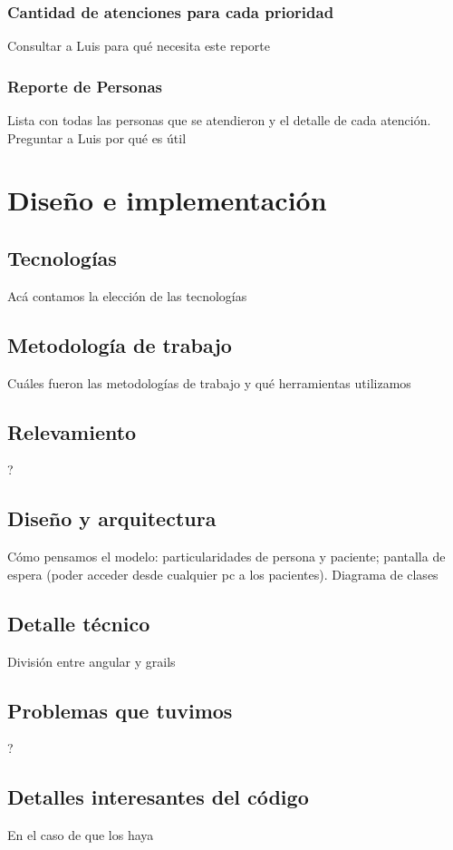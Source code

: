 \documentclass[a4paper,10pt]{article}
\begin{document}
\subsubsection{Cantidad de atenciones para cada prioridad}
Consultar a Luis para qué necesita este reporte
\subsubsection{Reporte de Personas}
Lista con todas las personas que se atendieron y el detalle de cada atención. Preguntar a Luis por qué es útil

\newpage 
\section{Diseño e implementación}
\subsection{Tecnologías}
Acá contamos la elección de las tecnologías

\subsection{Metodología de trabajo}
Cuáles fueron las metodologías de trabajo y qué herramientas utilizamos

\subsection{Relevamiento}
?

\subsection{Diseño y arquitectura}
Cómo pensamos el modelo: particularidades de persona y paciente; pantalla de espera (poder acceder desde cualquier pc a los pacientes).
Diagrama de clases 

\subsection{Detalle técnico}
División entre angular y grails

\subsection{Problemas que tuvimos}
?

\subsection{Detalles interesantes del código}
En el caso de que los haya 
\end{document}
